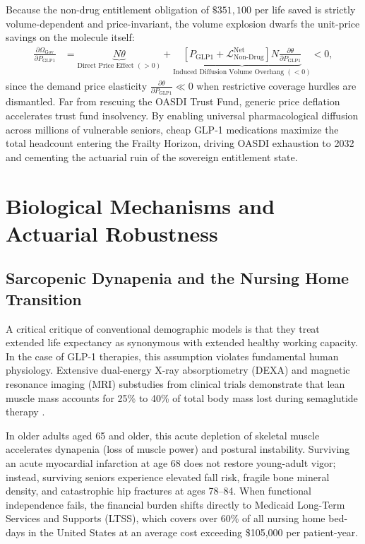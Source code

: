 \documentclass[11pt,a4paper]{article}
\begin{document}
Because the non-drug entitlement obligation of $\$351,100$ per life saved is strictly volume-dependent and price-invariant, the volume explosion dwarfs the unit-price savings on the molecule itself:
\begin{equation}
\begin{aligned}
    \frac{\partial \Omega_{\text{Gov}}}{\partial P_{\text{GLP1}}} &= \underbrace{N \theta}_{\text{Direct Price Effect } (> 0)} + \underbrace{\left[ P_{\text{GLP1}} + \mathcal{L}_{\text{Non-Drug}}^{\text{Net}} \right] N \frac{\partial \theta}{\partial P_{\text{GLP1}}}}_{\text{Induced Diffusion Volume Overhang } (< 0)} < 0,
\end{aligned}
\end{equation}
since the demand price elasticity $\frac{\partial \theta}{\partial P_{\text{GLP1}}} \ll 0$ when restrictive coverage hurdles are dismantled. Far from rescuing the OASDI Trust Fund, generic price deflation accelerates trust fund insolvency. By enabling universal pharmacological diffusion across millions of vulnerable seniors, cheap GLP-1 medications maximize the total headcount entering the Frailty Horizon, driving OASDI exhaustion to 2032 and cementing the actuarial ruin of the sovereign entitlement state.

\section{Biological Mechanisms and Actuarial Robustness}
\label{sec:mechanisms}

\subsection{Sarcopenic Dynapenia and the Nursing Home Transition}
A critical critique of conventional demographic models is that they treat extended life expectancy as synonymous with extended healthy working capacity. In the case of GLP-1 therapies, this assumption violates fundamental human physiology. Extensive dual-energy X-ray absorptiometry (DEXA) and magnetic resonance imaging (MRI) substudies from clinical trials demonstrate that lean muscle mass accounts for 25\% to 40\% of total body mass lost during semaglutide therapy \citep{batsis2018sarcopenic,sargeant2024body}.

In older adults aged 65 and older, this acute depletion of skeletal muscle accelerates dynapenia (loss of muscle power) and postural instability. Surviving an acute myocardial infarction at age 68 does not restore young-adult vigor; instead, surviving seniors experience elevated fall risk, fragile bone mineral density, and catastrophic hip fractures at ages 78--84. When functional independence fails, the financial burden shifts directly to Medicaid Long-Term Services and Supports (LTSS), which covers over 60\% of all nursing home bed-days in the United States at an average cost exceeding \$105,000 per patient-year.
\end{document}
